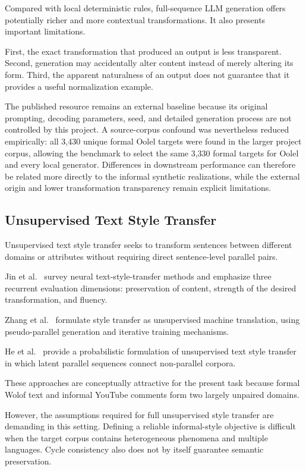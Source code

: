 \documentclass[12pt, a4paper, twoside, openany]{report}
\begin{document}
Compared with local deterministic rules, full-sequence \ac{LLM} generation offers potentially richer and more contextual transformations. It also presents important limitations.

First, the exact transformation that produced an output is less transparent. Second, generation may accidentally alter content instead of merely altering its form. Third, the apparent naturalness of an output does not guarantee that it provides a useful normalization example.

The published resource remains an external baseline because its original prompting, decoding parameters, seed, and detailed generation process are not controlled by this project. A source-corpus confound was nevertheless reduced empirically: all 3,430 unique formal Oolel targets were found in the larger project corpus, allowing the benchmark to select the same 3,330 formal targets for Oolel and every local generator. Differences in downstream performance can therefore be related more directly to the informal synthetic realizations, while the external origin and lower transformation transparency remain explicit limitations.


\subsection{Unsupervised Text Style Transfer}

Unsupervised text style transfer seeks to transform sentences between different domains or attributes without requiring direct sentence-level parallel pairs.

Jin et al.~\cite{jin2022styletransfer} survey neural text-style-transfer methods and emphasize three recurrent evaluation dimensions: preservation of content, strength of the desired transformation, and fluency.

Zhang et al.~\cite{zhang2018styletransfer} formulate style transfer as unsupervised machine translation, using pseudo-parallel generation and iterative training mechanisms.

He et al.~\cite{he2020probabilistic} provide a probabilistic formulation of unsupervised text style transfer in which latent parallel sequences connect non-parallel corpora.

These approaches are conceptually attractive for the present task because formal Wolof text and informal YouTube comments form two largely unpaired domains.

However, the assumptions required for full unsupervised style transfer are demanding in this setting. Defining a reliable informal-style objective is difficult when the target corpus contains heterogeneous phenomena and multiple languages. Cycle consistency also does not by itself guarantee semantic preservation.
\end{document}
